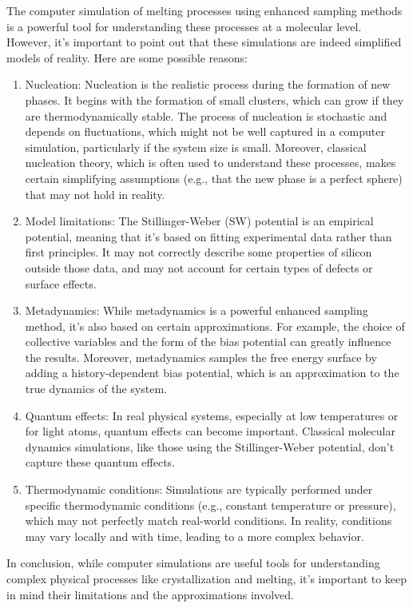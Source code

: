 \documentclass{article}
\begin{document}
The computer simulation of melting processes using enhanced sampling methods is a powerful tool for understanding these processes at a molecular level. However, it's important to point out that these simulations are indeed simplified models of reality. Here are some possible reasons:
\begin{enumerate}
    \item Nucleation: Nucleation is the realistic process during the formation of new phases. It begins with the formation of small clusters, which can grow if they are thermodynamically stable. The process of nucleation is stochastic and depends on fluctuations, which might not be well captured in a computer simulation, particularly if the system size is small. Moreover, classical nucleation theory, which is often used to understand these processes, makes certain simplifying assumptions (e.g., that the new phase is a perfect sphere) that may not hold in reality.
    \item Model limitations: The Stillinger-Weber (SW) potential is an empirical potential, meaning that it's based on fitting experimental data rather than first principles. It may not correctly describe some properties of silicon outside those data, and may not account for certain types of defects or surface effects.
    \item Metadynamics: While metadynamics is a powerful enhanced sampling method, it's also based on certain approximations. For example, the choice of collective variables and the form of the bias potential can greatly influence the results. Moreover, metadynamics samples the free energy surface by adding a history-dependent bias potential, which is an approximation to the true dynamics of the system.
    \item Quantum effects: In real physical systems, especially at low temperatures or for light atoms, quantum effects can become important. Classical molecular dynamics simulations, like those using the Stillinger-Weber potential, don't capture these quantum effects.
    \item Thermodynamic conditions: Simulations are typically performed under specific thermodynamic conditions (e.g., constant temperature or pressure), which may not perfectly match real-world conditions. In reality, conditions may vary locally and with time, leading to a more complex behavior.
\end{enumerate}
In conclusion, while computer simulations are useful tools for understanding complex physical processes like crystallization and melting, it's important to keep in mind their limitations and the approximations involved.
\end{document}
